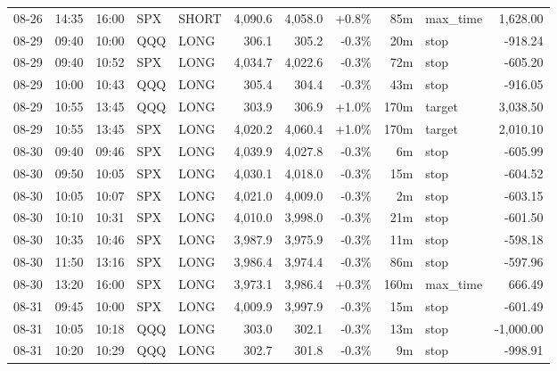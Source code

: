 \documentclass[11pt,a4paper,twoside]{article}
\begin{document}
\begin{center}
\begin{longtable}{>{\color{txtmain}}l l l l l r r r r >{\color{txtmain}}l r}
08-26 & 14:35 & 16:00 & SPX & SHORT & 4,090.6 & 4,058.0 & \textcolor{wingreen}{+0.8\%} & 85m & max\_time & \textcolor{wingreen}{1,628.00} \\
08-29 & 09:40 & 10:00 & QQQ & LONG & 306.1 & 305.2 & \textcolor{lossred}{-0.3\%} & 20m & stop & \textcolor{lossred}{-918.24} \\
08-29 & 09:40 & 10:52 & SPX & LONG & 4,034.7 & 4,022.6 & \textcolor{lossred}{-0.3\%} & 72m & stop & \textcolor{lossred}{-605.20} \\
08-29 & 10:00 & 10:43 & QQQ & LONG & 305.4 & 304.4 & \textcolor{lossred}{-0.3\%} & 43m & stop & \textcolor{lossred}{-916.05} \\
08-29 & 10:55 & 13:45 & QQQ & LONG & 303.9 & 306.9 & \textcolor{wingreen}{+1.0\%} & 170m & target & \textcolor{wingreen}{3,038.50} \\
08-29 & 10:55 & 13:45 & SPX & LONG & 4,020.2 & 4,060.4 & \textcolor{wingreen}{+1.0\%} & 170m & target & \textcolor{wingreen}{2,010.10} \\
08-30 & 09:40 & 09:46 & SPX & LONG & 4,039.9 & 4,027.8 & \textcolor{lossred}{-0.3\%} & 6m & stop & \textcolor{lossred}{-605.99} \\
08-30 & 09:50 & 10:05 & SPX & LONG & 4,030.1 & 4,018.0 & \textcolor{lossred}{-0.3\%} & 15m & stop & \textcolor{lossred}{-604.52} \\
08-30 & 10:05 & 10:07 & SPX & LONG & 4,021.0 & 4,009.0 & \textcolor{lossred}{-0.3\%} & 2m & stop & \textcolor{lossred}{-603.15} \\
08-30 & 10:10 & 10:31 & SPX & LONG & 4,010.0 & 3,998.0 & \textcolor{lossred}{-0.3\%} & 21m & stop & \textcolor{lossred}{-601.50} \\
08-30 & 10:35 & 10:46 & SPX & LONG & 3,987.9 & 3,975.9 & \textcolor{lossred}{-0.3\%} & 11m & stop & \textcolor{lossred}{-598.18} \\
08-30 & 11:50 & 13:16 & SPX & LONG & 3,986.4 & 3,974.4 & \textcolor{lossred}{-0.3\%} & 86m & stop & \textcolor{lossred}{-597.96} \\
08-30 & 13:20 & 16:00 & SPX & LONG & 3,973.1 & 3,986.4 & \textcolor{wingreen}{+0.3\%} & 160m & max\_time & \textcolor{wingreen}{666.49} \\
08-31 & 09:45 & 10:00 & SPX & LONG & 4,009.9 & 3,997.9 & \textcolor{lossred}{-0.3\%} & 15m & stop & \textcolor{lossred}{-601.49} \\
08-31 & 10:05 & 10:18 & QQQ & LONG & 303.0 & 302.1 & \textcolor{lossred}{-0.3\%} & 13m & stop & \textcolor{lossred}{-1,000.00} \\
08-31 & 10:20 & 10:29 & QQQ & LONG & 302.7 & 301.8 & \textcolor{lossred}{-0.3\%} & 9m & stop & \textcolor{lossred}{-998.91} \\

\end{longtable}
\end{center}
\end{document}
